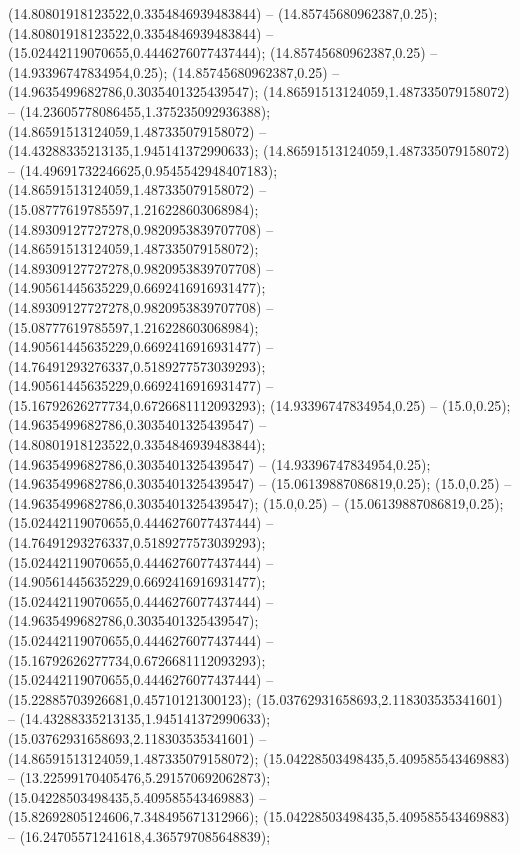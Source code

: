  (14.80801918123522,0.3354846939483844) -- (14.85745680962387,0.25);
 (14.80801918123522,0.3354846939483844) -- (15.02442119070655,0.4446276077437444);
 (14.85745680962387,0.25) -- (14.93396747834954,0.25);
 (14.85745680962387,0.25) -- (14.9635499682786,0.3035401325439547);
 (14.86591513124059,1.487335079158072) -- (14.23605778086455,1.375235092936388);
 (14.86591513124059,1.487335079158072) -- (14.43288335213135,1.945141372990633);
 (14.86591513124059,1.487335079158072) -- (14.49691732246625,0.9545542948407183);
 (14.86591513124059,1.487335079158072) -- (15.08777619785597,1.216228603068984);
 (14.89309127727278,0.9820953839707708) -- (14.86591513124059,1.487335079158072);
 (14.89309127727278,0.9820953839707708) -- (14.90561445635229,0.6692416916931477);
 (14.89309127727278,0.9820953839707708) -- (15.08777619785597,1.216228603068984);
 (14.90561445635229,0.6692416916931477) -- (14.76491293276337,0.5189277573039293);
 (14.90561445635229,0.6692416916931477) -- (15.16792626277734,0.6726681112093293);
 (14.93396747834954,0.25) -- (15.0,0.25);
 (14.9635499682786,0.3035401325439547) -- (14.80801918123522,0.3354846939483844);
 (14.9635499682786,0.3035401325439547) -- (14.93396747834954,0.25);
 (14.9635499682786,0.3035401325439547) -- (15.06139887086819,0.25);
 (15.0,0.25) -- (14.9635499682786,0.3035401325439547);
 (15.0,0.25) -- (15.06139887086819,0.25);
 (15.02442119070655,0.4446276077437444) -- (14.76491293276337,0.5189277573039293);
 (15.02442119070655,0.4446276077437444) -- (14.90561445635229,0.6692416916931477);
 (15.02442119070655,0.4446276077437444) -- (14.9635499682786,0.3035401325439547);
 (15.02442119070655,0.4446276077437444) -- (15.16792626277734,0.6726681112093293);
 (15.02442119070655,0.4446276077437444) -- (15.22885703926681,0.45710121300123);
 (15.03762931658693,2.118303535341601) -- (14.43288335213135,1.945141372990633);
 (15.03762931658693,2.118303535341601) -- (14.86591513124059,1.487335079158072);
 (15.04228503498435,5.409585543469883) -- (13.22599170405476,5.291570692062873);
 (15.04228503498435,5.409585543469883) -- (15.82692805124606,7.348495671312966);
 (15.04228503498435,5.409585543469883) -- (16.24705571241618,4.365797085648839);
